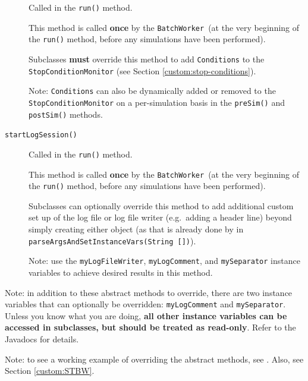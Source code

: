 \documentclass{article}
\newcommand{\BW}{{\tt BatchWorker}}
\begin{document}
\begin{description}
Called in the {\tt run()} method.

This method is called \textbf{once} by the \BW\ (at the very beginning of the {\tt run()} method, before any simulations have been performed).

Subclasses \textbf{must} override this method to add {\tt Conditions} to the {\tt StopConditionMonitor} (see Section \ref{custom:stop-conditions}).

\begin{sideblock}
Note: {\tt Conditions} can also be dynamically added or removed to the {\tt StopConditionMonitor} on a per-simulation basis in the {\tt preSim()} and {\tt postSim()} methods.
\end{sideblock}

\item[{\tt startLogSession()} ] \mbox{}

Called in the {\tt run()} method.

This method is called \textbf{once} by the \BW\ (at the very beginning of the {\tt run()} method, before any simulations have been performed).

Subclasses can optionally override this method to add additional custom set up of the log file or log file writer (e.g.\ adding a header line) beyond simply creating either object (as that is already done by  in {\tt parseArgsAndSetInstanceVars(String [])}).

\begin{sideblock}
Note: use the {\tt myLogFileWriter}, {\tt myLogComment}, and {\tt mySeparator} instance variables to achieve desired results in this method.
\end{sideblock}

\end{description}

\begin{sideblock}
Note: in addition to these abstract methods to override, there are two instance variables that can optionally be overridden: {\tt myLogComment} and {\tt mySeparator}. Unless you know what you are doing, \textbf{all other instance variables can be accessed in  subclasses, but should be treated as read-only}. Refer to the Javadocs for details.
\end{sideblock}

\begin{sideblock}
Note: to see a working example of overriding the abstract  methods, see . Also, see Section \ref{custom:STBW}.
\end{sideblock}
\end{document}
